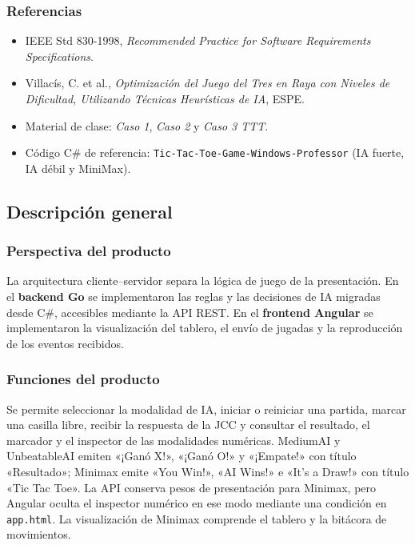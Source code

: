 \documentclass[12pt,a4paper]{article}
\begin{document}
\subsubsection{Referencias}
\begin{itemize}
  \item IEEE Std 830-1998, \emph{Recommended Practice for Software Requirements Specifications}.
  \item Villacís, C. et al., \emph{Optimización del Juego del Tres en Raya con
        Niveles de Dificultad, Utilizando Técnicas Heurísticas de IA}, ESPE.
  \item Material de clase: \emph{Caso 1}, \emph{Caso 2} y \emph{Caso 3 TTT}.
  \item Código C\# de referencia: \texttt{Tic-Tac-Toe-Game-Windows-Professor} (IA fuerte, IA débil y MiniMax).
\end{itemize}

\subsection{Descripción general}

\subsubsection{Perspectiva del producto}
La arquitectura cliente--servidor separa la lógica de juego de la presentación.
En el \textbf{backend Go} se implementaron las reglas y las decisiones de IA
migradas desde C\#, accesibles mediante la API REST. En el \textbf{frontend Angular}
se implementaron la visualización del tablero, el envío de jugadas y la
reproducción de los eventos recibidos.

\subsubsection{Funciones del producto}
Se permite seleccionar la modalidad de IA, iniciar o reiniciar una partida,
marcar una casilla libre, recibir la respuesta de la JCC y consultar el resultado,
el marcador y el inspector de las modalidades numéricas.
MediumAI y UnbeatableAI emiten «¡Ganó X!», «¡Ganó O!» y «¡Empate!» con título
«Resultado»; Minimax emite «You Win!», «AI Wins!» e «It's a Draw!» con título
«Tic Tac Toe». La API conserva pesos de presentación para Minimax, pero Angular
oculta el inspector numérico en ese modo mediante una condición en
\texttt{app.html}. La visualización de Minimax comprende el tablero y la bitácora
de movimientos.
\end{document}
